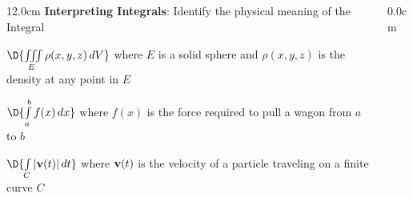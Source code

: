 \begin{frame}
{}
\scriptsize
\begin{columns}
\begin{column}{12.0cm}
{\bf Interpreting Integrals}: Identify the physical meaning of the Integral

\vspace{0.2cm}

\OBUL $\D{\iiint \limits_{E}^{} \rho(x,y,z)\, dV}$  \quad where \quad $E$ is a solid sphere and $\rho(x,y,z)$ is the density at any point in $E$

\vspace{0.2cm}

\begin{center}
\end{center}

\vspace{0.6cm}

\OBUL $\D{\int \limits_{a}^{b} f(x)\, dx}$  \quad where \quad $f(x)$ is the force required to pull a wagon from $a$ to $b$

\vspace{0.2cm}

\begin{center}
\end{center}

\vspace{0.6cm}

\OBUL $\D{\int \limits_{C} |{\bf v}(t)|\, dt}$  \quad where \quad ${\bf v}(t)$ is the velocity of a particle traveling on a finite curve $C$

\vspace{0.2cm}

\begin{center}
\end{center}

\vspace{0.6cm}

\end{column}
\begin{column}{0.0cm}\end{column}
\end{columns}
\end{frame}

